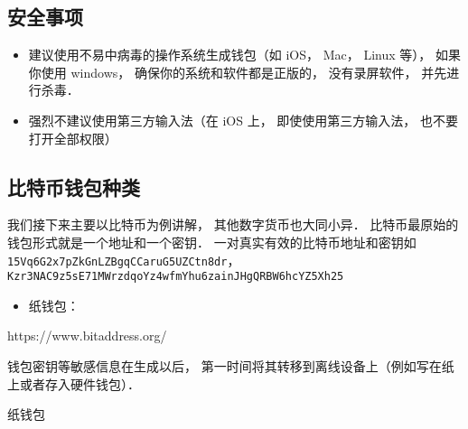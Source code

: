 
\subsection{安全事项}
\begin{itemize}
\item 建议使用不易中病毒的操作系统生成钱包（如 iOS， Mac， Linux 等）， 如果你使用 windows， 确保你的系统和软件都是正版的， 没有录屏软件， 并先进行杀毒．
\item 强烈不建议使用第三方输入法（在 iOS 上， 即使使用第三方输入法， 也不要打开全部权限）
\end{itemize}

\subsection{比特币钱包种类}
我们接下来主要以比特币为例讲解， 其他数字货币也大同小异． 比特币最原始的钱包形式就是一个地址和一个密钥． 一对真实有效的比特币地址和密钥如 \verb|15Vq6G2x7pZkGnLZBgqCCaruG5UZCtn8dr|， \verb|Kzr3NAC9z5sE71MWrzdqoYz4wfmYhu6zainJHgQRBW6hcYZ5Xh25|

\begin{itemize}
\item 纸钱包： 
\end{itemize}



https://www.bitaddress.org/


钱包密钥等敏感信息在生成以后， 第一时间将其转移到离线设备上（例如写在纸上或者存入硬件钱包）．

纸钱包


